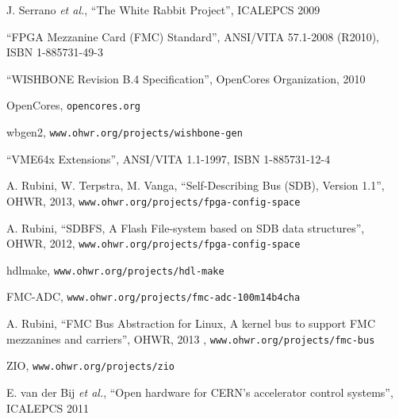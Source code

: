 \documentclass{JAC2003}
\begin{document}
\begin{thebibliography}{99} %

J. Serrano \textit{et al.}, ``The White Rabbit Project'', ICALEPCS 2009

``FPGA Mezzanine Card (FMC) Standard'', ANSI/VITA 57.1-2008 (R2010), ISBN 1-885731-49-3

``WISHBONE Revision B.4 Specification'', OpenCores Organization, 2010

OpenCores, \texttt{opencores.org}

wbgen2, \texttt{www.ohwr.org/projects/wishbone-gen}

``VME64x Extensions'', ANSI/VITA 1.1-1997, ISBN 1-885731-12-4

A. Rubini, W. Terpstra, M. Vanga, ``Self-Describing Bus (SDB), Version 1.1'', OHWR, 2013, \texttt{www.ohwr.org/projects/fpga-config-space}

A. Rubini, ``SDBFS, A Flash File-system based on SDB data structures'', OHWR, 2012, \texttt{www.ohwr.org/projects/fpga-config-space}

hdlmake, \texttt{www.ohwr.org/projects/hdl-make}

FMC-ADC, \texttt{www.ohwr.org/projects/fmc-adc-100m14b4cha}

A. Rubini, ``FMC Bus Abstraction for Linux, A kernel bus to support FMC mezzanines and carriers'', OHWR, 2013 , \texttt{www.ohwr.org/projects/fmc-bus}

ZIO, \texttt{www.ohwr.org/projects/zio}

E. van der Bij \textit{et al.}, ``Open hardware for CERN's accelerator control systems'', ICALEPCS 2011

\end{thebibliography}
\end{document}
